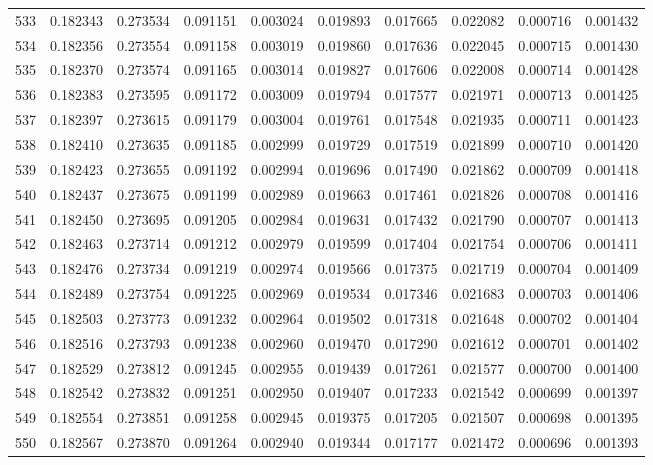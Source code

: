 \begin{tabular}{lrrrrrrrrr}
533 & 0.182343 & 0.273534 & 0.091151 & 0.003024 & 0.019893 & 0.017665 & 0.022082 & 0.000716 & 0.001432 \\
534 & 0.182356 & 0.273554 & 0.091158 & 0.003019 & 0.019860 & 0.017636 & 0.022045 & 0.000715 & 0.001430 \\
535 & 0.182370 & 0.273574 & 0.091165 & 0.003014 & 0.019827 & 0.017606 & 0.022008 & 0.000714 & 0.001428 \\
536 & 0.182383 & 0.273595 & 0.091172 & 0.003009 & 0.019794 & 0.017577 & 0.021971 & 0.000713 & 0.001425 \\
537 & 0.182397 & 0.273615 & 0.091179 & 0.003004 & 0.019761 & 0.017548 & 0.021935 & 0.000711 & 0.001423 \\
538 & 0.182410 & 0.273635 & 0.091185 & 0.002999 & 0.019729 & 0.017519 & 0.021899 & 0.000710 & 0.001420 \\
539 & 0.182423 & 0.273655 & 0.091192 & 0.002994 & 0.019696 & 0.017490 & 0.021862 & 0.000709 & 0.001418 \\
540 & 0.182437 & 0.273675 & 0.091199 & 0.002989 & 0.019663 & 0.017461 & 0.021826 & 0.000708 & 0.001416 \\
541 & 0.182450 & 0.273695 & 0.091205 & 0.002984 & 0.019631 & 0.017432 & 0.021790 & 0.000707 & 0.001413 \\
542 & 0.182463 & 0.273714 & 0.091212 & 0.002979 & 0.019599 & 0.017404 & 0.021754 & 0.000706 & 0.001411 \\
543 & 0.182476 & 0.273734 & 0.091219 & 0.002974 & 0.019566 & 0.017375 & 0.021719 & 0.000704 & 0.001409 \\
544 & 0.182489 & 0.273754 & 0.091225 & 0.002969 & 0.019534 & 0.017346 & 0.021683 & 0.000703 & 0.001406 \\
545 & 0.182503 & 0.273773 & 0.091232 & 0.002964 & 0.019502 & 0.017318 & 0.021648 & 0.000702 & 0.001404 \\
546 & 0.182516 & 0.273793 & 0.091238 & 0.002960 & 0.019470 & 0.017290 & 0.021612 & 0.000701 & 0.001402 \\
547 & 0.182529 & 0.273812 & 0.091245 & 0.002955 & 0.019439 & 0.017261 & 0.021577 & 0.000700 & 0.001400 \\
548 & 0.182542 & 0.273832 & 0.091251 & 0.002950 & 0.019407 & 0.017233 & 0.021542 & 0.000699 & 0.001397 \\
549 & 0.182554 & 0.273851 & 0.091258 & 0.002945 & 0.019375 & 0.017205 & 0.021507 & 0.000698 & 0.001395 \\
550 & 0.182567 & 0.273870 & 0.091264 & 0.002940 & 0.019344 & 0.017177 & 0.021472 & 0.000696 & 0.001393 \\

\end{tabular}
